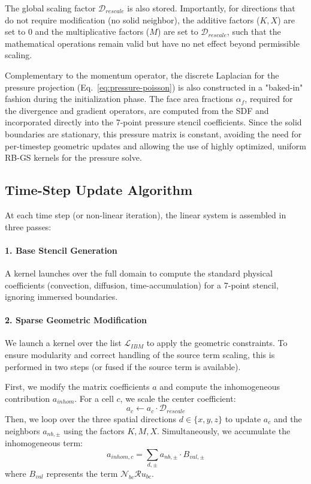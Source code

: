 \documentclass[preprint,12pt]{elsarticle}
\begin{document}
The global scaling factor $\mathcal{D}_{rescale}$ is also stored. Importantly, for directions that do not require modification (no solid neighbor), the additive factors ($K, X$) are set to 0 and the multiplicative factors ($M$) are set to $\mathcal{D}_{rescale}$, such that the mathematical operations remain valid but have no net effect beyond permissible scaling.

Complementary to the momentum operator, the discrete Laplacian for the pressure projection (Eq.~\ref{eq:pressure-poisson}) is also constructed in a "baked-in" fashion during the initialization phase. The face area fractions $\alpha_f$, required for the divergence and gradient operators, are computed from the SDF and incorporated directly into the 7-point pressure stencil coefficients. Since the solid boundaries are stationary, this pressure matrix is constant, avoiding the need for per-timestep geometric updates and allowing the use of highly optimized, uniform RB-GS kernels for the pressure solve.

\subsection{Time-Step Update Algorithm}
At each time step (or non-linear iteration), the linear system is assembled in three passes:

\paragraph{1. Base Stencil Generation}
A kernel launches over the full domain to compute the standard physical coefficients (convection, diffusion, time-accumulation) for a 7-point stencil, ignoring immersed boundaries.

\paragraph{2. Sparse Geometric Modification}
We launch a kernel over the list $\mathcal{L}_{IBM}$ to apply the geometric constraints. To ensure modularity and correct handling of the source term scaling, this is performed in two steps (or fused if the source term is available).

First, we modify the matrix coefficients $a$ and compute the inhomogeneous contribution $a_{inhom}$. For a cell $c$, we scale the center coefficient:
\begin{equation}
   a_c \leftarrow a_c \cdot \mathcal{D}_{rescale}
\end{equation}
Then, we loop over the three spatial directions $d \in \{x, y, z\}$ to update $a_c$ and the neighbors $a_{nb,\pm}$ using the factors $K, M, X$. Simultaneously, we accumulate the inhomogeneous term:
\begin{equation}
    a_{inhom,c} = \sum_{d, \pm} a_{nb,\pm} \cdot B_{val,\pm}
\end{equation}
where $B_{val}$ represents the term $\mathcal{N}_{bc} \mathcal{R} u_{bc}$.
\end{document}
